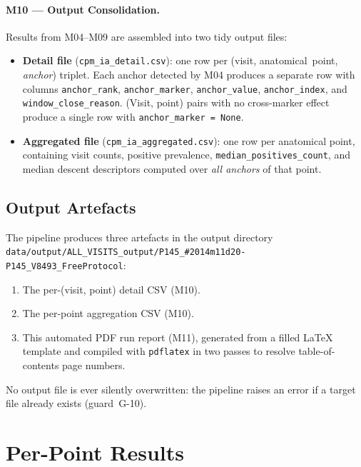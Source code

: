 \documentclass[a4paper,11pt]{article}
\begin{document}
\paragraph{M10 --- Output Consolidation.}
Results from M04--M09 are assembled into two tidy output files:
\begin{itemize}
  \item \textbf{Detail file} (\texttt{cpm\_ia\_detail.csv}): one row per
        (visit, anatomical~point, \emph{anchor}) triplet. Each anchor detected by M04
        produces a separate row with columns \texttt{anchor\_rank},
        \texttt{anchor\_marker}, \texttt{anchor\_value}, \texttt{anchor\_index},
        and \texttt{window\_close\_reason}.
        (Visit, point) pairs with no cross-marker effect produce a single row with
        \texttt{anchor\_marker = None}.
  \item \textbf{Aggregated file} (\texttt{cpm\_ia\_aggregated.csv}): one row per
        anatomical point, containing visit counts, positive prevalence,
        \texttt{median\_positives\_count}, and median descent descriptors computed over
        \emph{all anchors} of that point.
\end{itemize}

\subsection{Output Artefacts}

The pipeline produces three artefacts in the output directory \texttt{data/output/ALL\_VISITS\_output/P145\_\#2014m11d20-P145\_V8493\_FreeProtocol}:
\begin{enumerate}
  \item The per-(visit, point) detail CSV (M10).
  \item The per-point aggregation CSV (M10).
  \item This automated PDF run report (M11), generated from a filled \LaTeX{} template
        and compiled with \texttt{pdflatex} in two passes to resolve table-of-contents
        page numbers.
\end{enumerate}
No output file is ever silently overwritten: the pipeline raises an error if a target
file already exists (guard~G-10).

\section{Per-Point Results}
\end{document}
